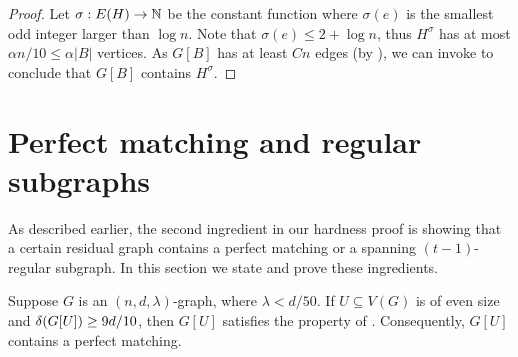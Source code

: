 \documentclass[11pt]{article}
\begin{document}
\begin{proof}
    Let $\sigma: E(H) \to \mathbb{N}$ be the constant function where $\sigma(e)$ is the smallest odd integer larger than $\log n$. Note that $\sigma(e) \le 2 + \log n$, thus $H^\sigma$ has at most $\alpha n / 10 \le \alpha |B|$ vertices. As $G[B]$ has at least $Cn$ edges (by ), we can invoke  to conclude that $G[B]$ contains $H^\sigma$.
\end{proof}

\section{Perfect matching and regular subgraphs}
\label{sec:matching-machinery}
As described earlier, the second ingredient in our hardness proof is showing that a certain residual graph contains a perfect matching or a spanning $(t-1)$-regular subgraph. In this section we state and prove these ingredients.

\begin{lemma}\label{thm:perfect-matching}
Suppose $G$ is an $(n, d, \lambda)$-graph, where $\lambda < d/50$. If $U \subseteq V(G)$ is of even size and $\delta(G[U]) \ge 9d/10$, then $G[U]$ satisfies the property of . Consequently, $G[U]$ contains a perfect matching. 
\end{lemma}
\end{document}
